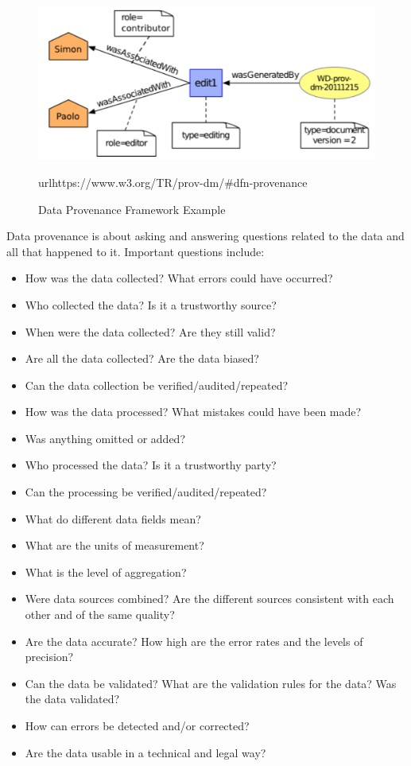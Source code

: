 \begin{figure}[h]
\centering
\includegraphics[width=.8\textwidth]{screen5.png}

\scriptsize{url{https://www.w3.org/TR/prov-dm/\#dfn-provenance}}
\caption{Data Provenance Framework Example}
\label{fig:provenanceexample}
\end{figure}

Data provenance is about asking and answering questions related to the data and all that happened to it. Important questions include:
\begin{itemize}
	\item How was the data collected? What errors could have occurred?
	\item Who collected the data? Is it a trustworthy source?
	\item When were the data collected? Are they still valid?
	\item Are all the data collected? Are the data biased?
	\item Can the data collection be verified/audited/repeated?
	\item How was the data processed? What mistakes could have been made? 
	\item Was anything omitted or added?
	\item Who processed the data? Is it a trustworthy party?
	\item Can the processing be verified/audited/repeated?	
	\item What do different data fields mean? 
	\item What are the units of measurement? 
	\item What is the level of aggregation?
	\item Were data sources combined? Are the different sources consistent with each other and of the same quality?
	\item Are the data accurate? How high are the error rates and the levels of precision?
	\item Can the data be validated? What are the validation rules for the data? Was the data validated?
	\item How can errors be detected and/or corrected?
	\item Are the data usable in a technical and legal way?
\end{itemize}



